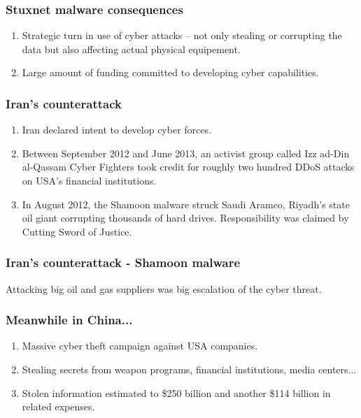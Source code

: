 \documentclass[xcolor=table]{beamer}
\begin{document}
\begin{frame}
\frametitle{Stuxnet malware consequences}
\begin{enumerate}
\item  \large{Strategic turn in use of cyber attacks -- not only stealing or corrupting the data but also affecting actual physical equipement.}
\item \large{Large amount of funding committed to developing cyber capabilities.}
\end{enumerate}
\end{frame}

\begin{frame}
\frametitle{Iran's counterattack}
\begin{enumerate}
\item \large{Iran declared intent to develop cyber forces.}
\item  \large{Between September 2012 and June 2013, an activist group called Izz ad-Din al-Qassam Cyber Fighters took credit for roughly two hundred DDoS attacks on USA's financial institutions.}
\item \large{In August 2012, the Shamoon malware struck Saudi Aramco, Riyadh’s state oil giant corrupting thousands of hard drives. Responsibility was claimed by Cutting Sword of Justice.}
\end{enumerate}
\end{frame}

\begin{frame}
\frametitle{Iran's counterattack - Shamoon malware}
\Large{Attacking big oil and gas suppliers was big escalation of the cyber threat.}
\end{frame}

\begin{frame}
\frametitle{Meanwhile in China...}
\begin{enumerate}
\item \large{Massive cyber theft campaign against USA companies.}
\item \large{Stealing secrets from weapon programs, financial institutions, media centers...}
\item \large{Stolen information estimated to \$250 billion and another \$114 billion in related expenses.}
\end{enumerate}
\end{frame}
\end{document}

